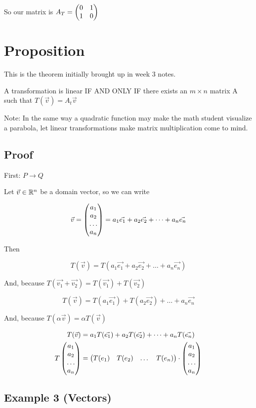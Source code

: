 \documentclass[a4paper]{article}
\begin{document}
So our matrix is $A_T = \genericmat{p}{0&1\\1&0}$

\section*{Proposition}
This is the theorem initially brought up in week 3 notes.

A transformation is linear IF AND ONLY IF there exists an $m \times n$ matrix A such that $\boxed{T(\vec{v}) = A_t\vec{v}}$

Note: In the same way a quadratic function may make the math student visualize a parabola, let linear transformations make matrix multiplication come to mind.

\subsection{Proof}

First: $P \to Q$

Let $\vec{v} \in \R^n$ be a domain vector, so we can write 

\[
	\vec{v} = \genericmat{p}{a_1\\a_2\\ \dots\\a_n} = a_1 \vec{e_1} + a_2 \vec{e_2} + \dots + a_n \vec{e_n}
\]

Then 

\[
	T(\vec{v}) = T(a_1 \vec{e_1} + a_2 \vec{e_2} + \dots + a_n \vec{e_n})
\]

And, because $T(\vec{v_1} + \vec{v_2}) = T(\vec{v_1}) + T(\vec{v_2})$

\[
	T(\vec{v}) = T(a_1 \vec{e_1}) + T(a_2 \vec{e_2}) + \dots + a_n \vec{e_n}
\]

And, because $T(\alpha \vec{v}) = \alpha T(\vec{v})$

\[
	\begin{aligned}
		T(\vec{v}) &= a_1T(\vec{e_1}) + a_2T(\vec{e_2}) + \dots + a_nT(\vec{e_n}) \\
		T\genericmat{p}{a_1\\a_2\\ \dots \\a_n} &= \genericmat{p}{T(e_1) & T(e_2) & \dots & T(e_n)} \cdot \genericmat{p}{a_1\\a_2\\ \dots \\ a_n}
	\end{aligned}
\]

\subsection{Example 3 (Vectors)}
\end{document}
